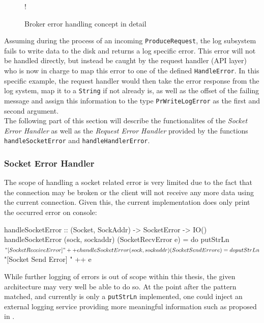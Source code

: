 \begin{figure}[H]
  \centering
   {!} {
    
  }
  \caption{Broker error handling concept in detail}
  \label{fig:broker-error-activity-detail}
\end{figure}

Assuming during the process of an incoming \lstinline{ProduceRequest}, the log
subsystem fails to write data to the disk and returns a log specific error. This
error will not be handled directly, but instead be caught by the request handler
(API layer) who is now in charge to map this error to one of the defined
\lstinline{HandleError}. In this specific example, the request handler would
then take the error response from the log system, map it to a \lstinline{String}
if not already is, as well as the offset of the failing message and assign this
information to the type \lstinline{PrWriteLogError} as the first and second
argument. \\

The following part of this section will describe the functionalites of the
\textit{Socket Error Handler} as well as the \textit{Request Error Handler}
provided by the functions \lstinline{handleSocketError} and
\lstinline{handleHandlerError}.

\subsubsection{Socket Error Handler}

The scope of handling a socket related error is very limited due to the fact
that the connection may be broken or the client will not receive any more data
using the current connection. Given this, the current implementation does only
print the occurred error on console:

\begin{code}
handleSocketError :: (Socket, SockAddr) -> SocketError -> IO()
handleSocketError (sock, sockaddr) (SocketRecvError e) = do
  putStrLn $ "[Socket Receive Error] " ++ e
handleSocketError (sock, sockaddr) (SocketSendError e) = do
  putStrLn $ "[Socket Send Error] " ++ e
\end{code}

While further logging of errors is out of scope within this thesis, the given
architecture may very well be able to do so. At the point after the pattern
matched, and currently is only a \lstinline{putStrLn} implemented, one
could inject an external logging service providing more meaningful information
such as proposed in .

